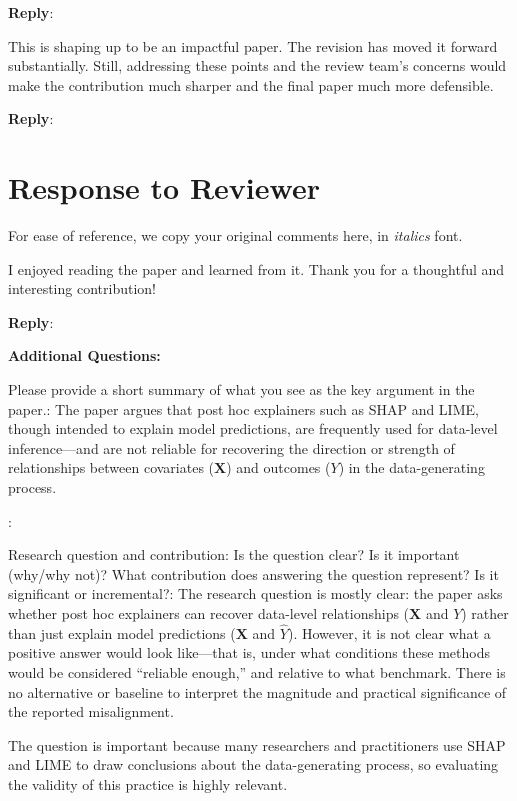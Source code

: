 \documentclass[11pt]{article}
\newcounter{se}[section]
\newcounter{aed}[section]
\newenvironment{aed*}[1][]{%
    \par\medskip%
    \rmfamily\itshape%
}{\medskip}
\newcounter{reviewer}
\newcounter{point}[reviewer]
\renewcommand{\thepoint}{R\,\thereviewer.\arabic{point}}
\newcommand{\reviewersection}{\stepcounter{reviewer} \newpage
 \section*{Response to Reviewer \thereviewer}}
\newenvironment{point}{
    \refstepcounter{point} \bigskip \noindent {\textbf{\thepoint}}: \rmfamily \itshape
}{\medskip}
\newenvironment{point*}{\bigskip \noindent \rmfamily \itshape}{\medskip} %
\newenvironment{reply}
 {\par\medskip \noindent \begin{sf}\textbf{Reply}:\ }
 {\medskip \end{sf}}
\begin{document}
\begin{reply}

\end{reply}


\begin{aed*}
This is shaping up to be an impactful paper. The revision has moved it forward substantially. Still, addressing these points and the review team's concerns would make the contribution much sharper and the final paper much more defensible.
\end{aed*}

\begin{reply}

\end{reply}


\reviewersection{}

\textsf{For ease of reference, we copy your original comments here, in \emph{italics} font.}

\begin{point*}
I enjoyed reading the paper and learned from it. Thank you for a thoughtful and interesting contribution!
\end{point*}

\begin{reply}

\end{reply}

\noindent \textbf{Additional Questions:}

\begin{point*}
Please provide a short summary of what you see as the key argument in the paper.: The paper argues that post hoc explainers such as SHAP and LIME, though intended to explain model predictions, are frequently used for data-level inference---and are not reliable for recovering the direction or strength of relationships between covariates ($\mathbf{X}$) and outcomes ($Y$) in the data-generating process.
\end{point*}

\begin{point}
Research question and contribution: Is the question clear? Is it important (why/why not)? What contribution does answering the question represent? Is it significant or incremental?: The research question is mostly clear: the paper asks whether post hoc explainers can recover data-level relationships ($\mathbf{X}$ and $Y$) rather than just explain model predictions ($\mathbf{X}$ and $\hat{Y}$). However, it is not clear what a positive answer would look like---that is, under what conditions these methods would be considered ``reliable enough,'' and relative to what benchmark. There is no alternative or baseline to interpret the magnitude and practical significance of the reported misalignment.

The question is important because many researchers and practitioners use SHAP and LIME to draw conclusions about the data-generating process, so evaluating the validity of this practice is highly relevant.
\end{point}
\end{document}
